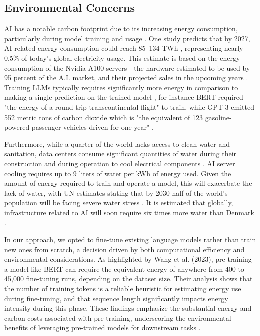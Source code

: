 \documentclass[licencjacka,en]{pracamgr}
\begin{document}
\subsection{Environmental Concerns}
AI has a notable carbon footprint due to its increasing energy consumption, particularly during model training and usage \cite{forbes_dl_env}. One study predicts that by 2027, AI-related energy consumption could reach 85–134 TWh \cite{this_study}, representing nearly 0.5\% of today's global electricity usage. This estimate is based on the energy consumption of the Nvidia A100 servers - the hardware estimated to be used by 95 percent of the A.I. market, and their projected sales in the upcoming years \cite{nyt_el}. Training LLMs typically requires significantly more energy in comparison to making a single prediction on the trained model \cite{sci_dir_comp}, for instance BERT required "the energy of a round-trip transcontinental flight" to train, while GPT-3 emitted 552 metric tons of carbon dioxide which is "the equivalent of 123 gasoline-powered passenger vehicles driven for one year" \cite{sci_am_co2}. 

Furthermore, while a quarter of the world lacks access to clean water and sanitation, data centers consume significant quantities of water during their construction and during operation to cool electrical components \cite{first}. AI server cooling requires up to 9 liters of water per kWh of energy used. Given the amount of energy required to train and operate a model, this will exacerbate the lack of water, with UN estimates stating that by 2030 half of the world’s population will be facing severe water stress \cite{water_scarcity}. It is estimated that globally, infrastructure related to AI will soon require six times more water than Denmark \cite{first}. 

In our approach, we opted to fine-tune existing language models rather than train new ones from scratch, a decision driven by both computational efficiency and environmental considerations. As highlighted by Wang et al. (2023), pre-training a model like BERT can require the equivalent energy of anywhere from 400 to 45,000 fine-tuning runs, depending on the dataset size. Their analysis shows that the number of training tokens is a reliable heuristic for estimating energy use during fine-tuning, and that sequence length significantly impacts energy intensity during this phase. These findings emphasize the substantial energy and carbon costs associated with pre-training, underscoring the environmental benefits of leveraging pre-trained models for downstream tasks \cite{finetuning_env_good}.
\end{document}
